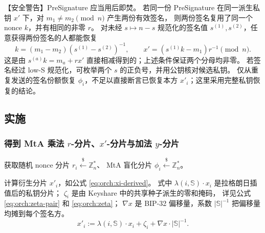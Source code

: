 【安全警告】PreSignature 应当用后即焚。
若同一份 PreSignature 在同一派生私钥 $x'$ 下，对 $m_1\ne m_2\pmod n$ 产生两份有效签名，
则两份签名复用了同一个 nonce $k$，并有相同的非零 $r$。
对未经 $s\mapsto n-s$ 规范化的签名值 $s^{(1)},s^{(2)}$，任意获得两份签名的人都能恢复
\begin{equation}
  k=(m_1-m_2)(s^{(1)}-s^{(2)})^{-1},\qquad
  x'=(s^{(1)}k-m_1)r^{-1}\pmod n.
\end{equation}
这是由 $s^{(a)}k=m_a+rx'$ 直接相减得到的；上述条件保证两个分母均非零。
若签名经过 low-S 规范化，可枚举两个 $s$ 的正负号，并用公钥核对候选私钥。
仅从重复发送的签名份额恢复 $\phi_i$，不足以直接断言已恢复本方 $x'_i$；这里采用完整私钥恢复的结论。

\subsection{实施}

\subsubsection{得到 MtA 乘法 $r$-分片、$x'$-分片与加法 $y$-分片}

获取随机 nonce 分片 $r_i \stackrel{\$}{\leftarrow} \mathbb{Z}_n^*$、
MtA 盲化分片 $\phi_i \stackrel{\$}{\leftarrow} \mathbb{Z}_n^*$。

计算衍生分片 $x'_i$，如公式 \eqref{eq:orch:xi-derived}。
式中 $\lambda(i,\mathbb{S})\cdot x_i$ 是拉格朗日插值后的私钥分片；
$\zeta_i$ 是由 Keyshare 中的共享种子派生的零和掩码，
详见公式 \eqref{eq:orch:zeta-pair} 和 \eqref{eq:orch:zeta}；
$\nabla x$ 是 BIP-32 偏移量，系数 $|\mathbb{S}|^{-1}$ 把偏移量均摊到每个签名方。
\begin{equation}
  \label{eq:orch:xi-derived}\tag{xi-derived}
  x'_i := \lambda(i,\mathbb{S})\cdot x_i + \zeta_i + \nabla x \cdot |\mathbb{S}|^{-1}.
\end{equation}


